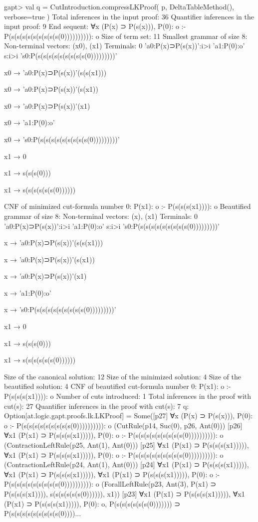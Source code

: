 \documentclass[a4paper,11pt]{article}
\begin{document}
\begin{clilisting}
gapt> val q = CutIntroduction.compressLKProof( p,                                   DeltaTableMethod(), verbose=true )
Total inferences in the input proof: 36
Quantifier inferences in the input proof: 9
End sequent: ∀x (P(x) ⊃ P(s(x))), P(0): o :- P(s(s(s(s(s(s(s(s(s(0)))))))))): o
Size of term set: 11
Smallest grammar of size 8:
Non-terminal vectors: (x0), (x1)
Terminals:
  0
  'a0:P(x)⊃P(s(x))':i>i
  'a1:P(0):o'
  s:i>i
  's0:P(s(s(s(s(s(s(s(s(s(0)))))))))'

x0 → 'a0:P(x)⊃P(s(x))'(s(s(x1)))

x0 → 'a0:P(x)⊃P(s(x))'(s(x1))

x0 → 'a0:P(x)⊃P(s(x))'(x1)

x0 → 'a1:P(0):o'

x0 → 's0:P(s(s(s(s(s(s(s(s(s(0)))))))))'

x1 → 0

x1 → s(s(s(0)))

x1 → s(s(s(s(s(s(0))))))

CNF of minimized cut-formula number 0:
  P(x1): o :- P(s(s(s(x1)))): o
Beautified grammar of size 8:
Non-terminal vectors: (x), (x1)
Terminals:
  0
  'a0:P(x)⊃P(s(x))':i>i
  'a1:P(0):o'
  s:i>i
  's0:P(s(s(s(s(s(s(s(s(s(0)))))))))'

x → 'a0:P(x)⊃P(s(x))'(s(s(x1)))

x → 'a0:P(x)⊃P(s(x))'(s(x1))

x → 'a0:P(x)⊃P(s(x))'(x1)

x → 'a1:P(0):o'

x → 's0:P(s(s(s(s(s(s(s(s(s(0)))))))))'

x1 → 0

x1 → s(s(s(0)))

x1 → s(s(s(s(s(s(0))))))

Size of the canonical solution: 12
Size of the minimized solution: 4
Size of the beautified solution: 4
CNF of beautified cut-formula number 0:
  P(x1): o :- P(s(s(s(x1)))): o
Number of cuts introduced: 1
Total inferences in the proof with cut(s): 27
Quantifier inferences in the proof with cut(s): 7
q: Option[at.logic.gapt.proofs.lk.LKProof] =
Some([p27] ∀x (P(x) ⊃ P(s(x))), P(0): o :- P(s(s(s(s(s(s(s(s(s(0)))))))))): o    (CutRule(p14, Suc(0), p26, Ant(0)))
[p26] ∀x1 (P(x1) ⊃ P(s(s(s(x1))))), P(0): o :- P(s(s(s(s(s(s(s(s(s(0)))))))))): o    (ContractionLeftRule(p25, Ant(1), Ant(0)))
[p25] ∀x1 (P(x1) ⊃ P(s(s(s(x1))))),
∀x1 (P(x1) ⊃ P(s(s(s(x1))))),
P(0): o
:-
P(s(s(s(s(s(s(s(s(s(0)))))))))): o    (ContractionLeftRule(p24, Ant(1), Ant(0)))
[p24] ∀x1 (P(x1) ⊃ P(s(s(s(x1))))),
∀x1 (P(x1) ⊃ P(s(s(s(x1))))),
∀x1 (P(x1) ⊃ P(s(s(s(x1))))),
P(0): o
:-
P(s(s(s(s(s(s(s(s(s(0)))))))))): o    (ForallLeftRule(p23, Ant(3), P(x1) ⊃ P(s(s(s(x1)))), s(s(s(s(s(s(0)))))), x1))
[p23] ∀x1 (P(x1) ⊃ P(s(s(s(x1))))),
∀x1 (P(x1) ⊃ P(s(s(s(x1))))),
P(0): o,
P(s(s(s(s(s(s(0))))))) ⊃ P(s(s(s(s(s(s(s(s(s(0))))...
\end{clilisting}
\end{document}
